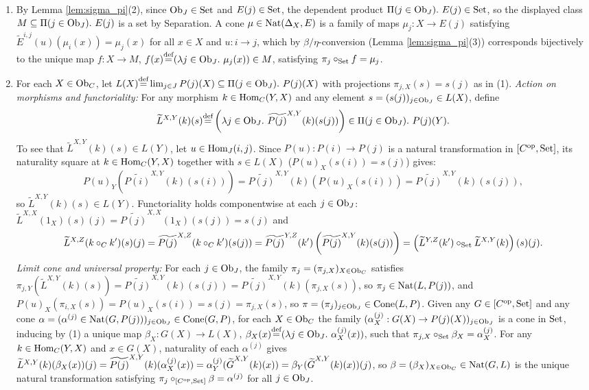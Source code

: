 \documentclass[10pt,a4paper]{article}
\begin{document}
\begin{enumerate}
\item By Lemma \ref{lem:sigma_pi}(2), since ${\textrm{Ob}}_J \in {\textrm{Set}}$ and $E(j) \in {\textrm{Set}}$, the dependent product $\Pi(j \in {\textrm{Ob}}_J).\ E(j) \in {\textrm{Set}}$, so the displayed class $M \subseteq \Pi(j \in {\textrm{Ob}}_J).\ E(j)$ is a set by Separation. A cone $\mu \in {\textrm{Nat}}(\Delta_X, E)$ is a family of maps $\mu_j : X \to E(j)$ satisfying $\widetilde{E}^{i,j}(u)(\mu_i(x)) = \mu_j(x)$ for all $x \in X$ and $u : i \to j$, which by $\beta/\eta$-conversion (Lemma \ref{lem:sigma_pi}(3)) corresponds bijectively to the unique map $f : X \to M$, $f(x) {\stackrel{{\textrm{def}}}{=}} (\lambda j \in {\textrm{Ob}}_J.\ \mu_j(x)) \in M$, satisfying $\pi_j \circ_{\textrm{Set}} f = \mu_j$.
\item For each $X \in {\textrm{Ob}}_C$, let $L(X) {\stackrel{{\textrm{def}}}{=}} \lim_{j \in J} P(j)(X) \subseteq \Pi(j \in {\textrm{Ob}}_J).\ P(j)(X)$ with projections $\pi_{j,X}(s) = s(j)$ as in (1).
\emph{Action on morphisms and functoriality:} For any morphism $k \in {\textrm{Hom}}_C(Y, X)$ and any element $s = (s(j))_{j \in {\textrm{Ob}}_J} \in L(X)$, define
$$\widetilde{L}^{X,Y}(k)(s) {\stackrel{{\textrm{def}}}{=}} \left(\lambda j \in {\textrm{Ob}}_J.\ \widetilde{P(j)}^{X,Y}(k)(s(j))\right) \in \Pi(j \in {\textrm{Ob}}_J).\ P(j)(Y).$$
To see that $\widetilde{L}^{X,Y}(k)(s) \in L(Y)$, let $u \in {\textrm{Hom}}_J(i, j)$. Since $P(u) : P(i) \to P(j)$ is a natural transformation in $[C^{\textrm{op}}, {\textrm{Set}}]$, its naturality square at $k \in {\textrm{Hom}}_C(Y, X)$ together with $s \in L(X)$ ($P(u)_X(s(i)) = s(j)$) gives:
$$P(u)_Y\left(\widetilde{P(i)}^{X,Y}(k)(s(i))\right) = \widetilde{P(j)}^{X,Y}(k)\left(P(u)_X(s(i))\right) = \widetilde{P(j)}^{X,Y}(k)(s(j)),$$
so $\widetilde{L}^{X,Y}(k)(s) \in L(Y)$. Functoriality holds componentwise at each $j \in {\textrm{Ob}}_J$: $\widetilde{L}^{X,X}(1_X)(s)(j) = \widetilde{P(j)}^{X,X}(1_X)(s(j)) = s(j)$ and
$$\widetilde{L}^{X,Z}(k \circ_C k')(s)(j) = \widetilde{P(j)}^{X,Z}(k \circ_C k')(s(j)) = \widetilde{P(j)}^{Y,Z}(k')\left(\widetilde{P(j)}^{X,Y}(k)(s(j))\right) = \left(\widetilde{L}^{Y,Z}(k') \circ_{\textrm{Set}} \widetilde{L}^{X,Y}(k)\right)(s)(j).$$
\emph{Limit cone and universal property:} For each $j \in {\textrm{Ob}}_J$, the family $\pi_j = (\pi_{j,X})_{X \in {\textrm{Ob}}_C}$ satisfies $\pi_{j,Y}(\widetilde{L}^{X,Y}(k)(s)) = \widetilde{P(j)}^{X,Y}(k)(s(j)) = \widetilde{P(j)}^{X,Y}(k)(\pi_{j,X}(s))$, so $\pi_j \in {\textrm{Nat}}(L, P(j))$, and $P(u)_X(\pi_{i,X}(s)) = P(u)_X(s(i)) = s(j) = \pi_{j,X}(s)$, so $\pi = (\pi_j)_{j \in {\textrm{Ob}}_J} \in {\mathrm{Cone}}(L, P)$. Given any $G \in [C^{\textrm{op}}, {\textrm{Set}}]$ and any cone $\alpha = (\alpha^{(j)} \in {\textrm{Nat}}(G, P(j)))_{j \in {\textrm{Ob}}_J} \in {\mathrm{Cone}}(G, P)$, for each $X \in {\textrm{Ob}}_C$ the family $(\alpha^{(j)}_X : G(X) \to P(j)(X))_{j \in {\textrm{Ob}}_J}$ is a cone in ${\textrm{Set}}$, inducing by (1) a unique map $\beta_X : G(X) \to L(X)$, $\beta_X(x) \eqdef (\lambda j \in \Ob_J.\ \alpha^{(j)}_X(x))$, such that $\pi_{j,X} \circ_{\textrm{Set}} \beta_X = \alpha^{(j)}_X$. For any $k \in {\textrm{Hom}}_C(Y, X)$ and $x \in G(X)$, naturality of each $\alpha^{(j)}$ gives $\widetilde{L}^{X,Y}(k)(\beta_X(x))(j) = \widetilde{P(j)}^{X,Y}(k)(\alpha^{(j)}_X(x)) = \alpha^{(j)}_Y({\widetilde{G}\textrm{}}^{X,Y}(k)(x)) = \beta_Y({\widetilde{G}\textrm{}}^{X,Y}(k)(x))(j)$, so $\beta = (\beta_X)_{X \in {\textrm{Ob}}_C} \in {\textrm{Nat}}(G, L)$ is the unique natural transformation satisfying $\pi_j \circ_{[C^{\textrm{op}},{\textrm{Set}}]} \beta = \alpha^{(j)}$ for all $j \in {\textrm{Ob}}_J$.

\end{enumerate}
\end{document}
